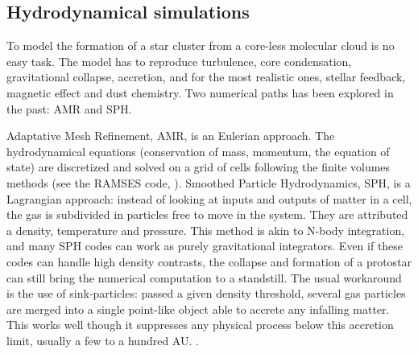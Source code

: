 \subsection{Hydrodynamical simulations}

To model the formation of a star cluster from a core-less molecular cloud is no easy task. The model has to reproduce turbulence, core condensation, gravitational collapse, accretion, and for the most realistic ones, stellar feedback, magnetic effect and dust chemistry. Two numerical paths has been explored in the past: AMR and SPH.

Adaptative Mesh Refinement, AMR, is an Eulerian approach. The hydrodynamical equations (conservation of mass, momentum, the equation of state) are discretized and solved on a grid of cells following the finite volumes methods (see the RAMSES code, \citealt{Teyssier2002}). Smoothed Particle Hydrodynamics, SPH, is a Lagrangian approach: instead of looking at inputs and outputs of matter in a cell, the gas is subdivided in particles free to move in the system. They are attributed a density, temperature and pressure. This method is akin to N-body integration, and many SPH codes can work as purely gravitational integrators. Even if these codes can handle high density contrasts, the collapse and formation of a protostar can still bring the numerical computation to a standstill. The usual workaround is the use of sink-particles: passed a given density threshold, several gas particles are merged into a single point-like object able to accrete any infalling matter. This works well though it suppresses any physical process below this accretion limit, usually a few to a hundred AU. \citep{Bate1997}.




